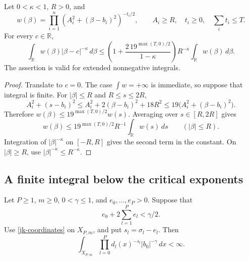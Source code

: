 \begin{lemma}\label{jk-slow}
Let \(0<\kappa<1\), \(R>0\), and
\[
 w(\beta)=\prod_{i=1}^{n}
                (A_i^2+(\beta-b_i)^2)^{-t_i/2},
 \qquad
 A_i\geq R,\quad t_i\geq0,\quad \sum_i t_i\leq T .
\]
For every \(c\in\mathbb R\),
\begin{equation}\label{jk-slow-bound}
 \int_{\mathbb R}w(\beta)|\beta-c|^{-\kappa}\,d\beta
 \leq
 \left(1+\frac{2\,19^{\max(T,0)/2}}{1-\kappa}\right)
 R^{-\kappa}\int_{\mathbb R}w(\beta)\,d\beta .
\end{equation}
The assertion is valid for extended nonnegative integrals.
\end{lemma}

\begin{proof}
Translate to \(c=0\).  The case \(\int w=+\infty\) is
immediate, so suppose that integral is finite.
For \(|\beta|\leq R\) and \(R\leq s\leq2R\),
\[
 A_i^2+(s-b_i)^2
 \leq A_i^2+2(\beta-b_i)^2+18R^2
 \leq19\bigl(A_i^2+(\beta-b_i)^2\bigr).
\]
Therefore \(w(\beta)\leq19^{\max(T,0)/2}w(s)\).
Averaging over \(s\in[R,2R]\) gives
\[
 w(\beta)\leq19^{\max(T,0)/2}R^{-1}
                       \int_{\mathbb R}w(s)\,ds
             \qquad (|\beta|\leq R).
\]
Integration of \(|\beta|^{-\kappa}\) on \([-R,R]\) gives
the second term in the constant.
On \(|\beta|\geq R\), use
\(|\beta|^{-\kappa}\leq R^{-\kappa}\).
\end{proof}

\subsection{A finite integral below the critical exponents}

\begin{proposition}\label{jk-weighted}
Let \(P\geq1\), \(m\geq0\), \(0<\gamma\leq1\), and
\(e_0,\ldots,e_P>0\).  Suppose that
\begin{equation}\label{jk-loss-condition}
 e_0+2\sum_{l=1}^{P}e_l<\gamma/2.
\end{equation}
Use \eqref{jk-coordinates} on \(X_{P,m}\), and put
\(s_l=\sigma_l-e_l\).  Then
\begin{equation}\label{jk-weighted-integral}
 \int_{X_{P,m}}\prod_{l=0}^{P}d_l(x)^{-s_l}
                                  |b_0|^{-\gamma}\,dx<\infty .
\end{equation}
\end{proposition}

